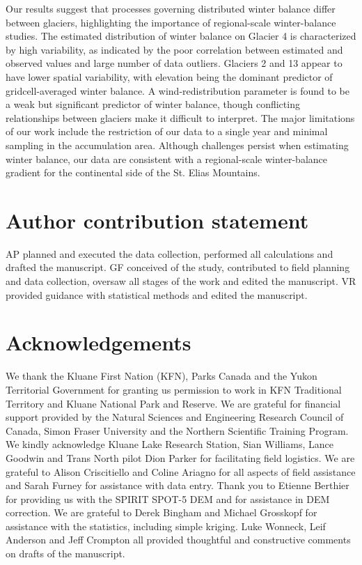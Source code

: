 \documentclass[twocolumn, letterpaper]{igs}
\begin{document}
Our results suggest that processes governing distributed winter balance differ between glaciers, highlighting the importance of regional-scale winter-balance studies. The estimated distribution of winter balance on Glacier 4 is characterized by high variability, as indicated by the poor correlation between estimated and observed values and large number of data outliers. Glaciers 2 and 13 appear to have lower spatial variability, with elevation being the dominant predictor of gridcell-averaged winter balance. A wind-redistribution parameter is found to be a weak but significant predictor of winter balance, though conflicting relationships between glaciers make it difficult to interpret. The major limitations of our work include the restriction of our data to a single year and minimal sampling in the accumulation area. Although challenges persist when estimating winter balance, our data are consistent with a regional-scale winter-balance gradient for the continental side of the St. Elias Mountains. 

\section{Author contribution statement}

AP planned and executed the data collection, performed all calculations and drafted the manuscript. GF conceived of the study, contributed to field planning and data collection, oversaw all stages of the work and edited the manuscript. VR provided guidance with statistical methods and edited the manuscript.

\section{Acknowledgements}

We thank the Kluane First Nation (KFN), Parks Canada and the Yukon Territorial Government for granting us permission to work in KFN Traditional Territory and Kluane National Park and Reserve. We are grateful for financial support provided by the Natural Sciences and Engineering Research Council of  Canada, Simon Fraser University and the Northern Scientific  Training  Program. We kindly acknowledge Kluane Lake Research Station, Sian Williams, Lance Goodwin and Trans North pilot Dion Parker for facilitating field logistics. We are grateful to Alison Criscitiello and Coline Ariagno for all aspects of field assistance and Sarah Furney for assistance with data entry. Thank you to Etienne Berthier for providing us with the SPIRIT SPOT-5 DEM and for assistance in DEM correction. We are grateful to Derek Bingham and Michael Grosskopf for assistance with the statistics, including simple kriging. Luke Wonneck, Leif Anderson and Jeff Crompton all provided thoughtful and constructive comments on drafts of the manuscript.
\end{document}
